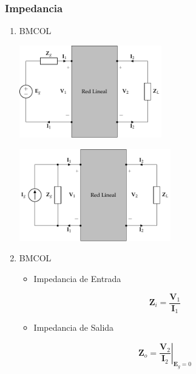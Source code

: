 \subsubsection{Impedancia}
\label{sec:org591ea39}
\begin{enumerate}
\item \hfill{}\textsc{BMCOL}
\label{sec:orgd9d6752}
\begin{center}
\includegraphics[height=4cm]{../figs/cuadripolo_cargado_fuente_tension.pdf}
\end{center}
\begin{center}
\includegraphics[height=4cm]{../figs/cuadripolo_cargado_fuente_corriente.pdf}
\end{center}


\item \hfill{}\textsc{BMCOL}
\label{sec:orgc27df88}
\begin{itemize}
\item Impedancia de Entrada
\end{itemize}
\[
\mathbf{Z}_i = \frac{\mathbf{V}_1}{\mathbf{I}_1}
\]

\begin{itemize}
\item Impedancia de Salida
\end{itemize}
\[
\mathbf{Z}_o = \left.\frac{\mathbf{V}_2}{\mathbf{I}_2}\right\rvert_{\mathbf{E}_g = 0}
\]
\end{enumerate}

